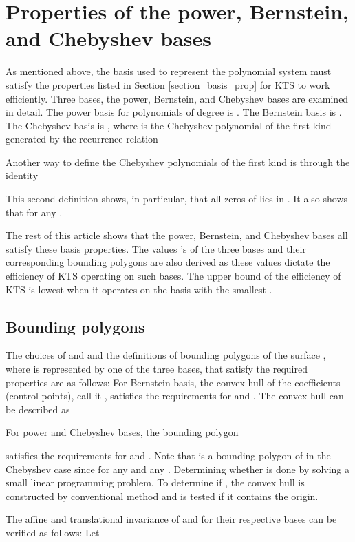 \documentclass[12pt]{article}
\begin{document}
\section{Properties of the power, Bernstein, and Chebyshev bases}

As mentioned above, the basis used to represent the polynomial
system must satisfy the properties listed in Section
\ref{section_basis_prop} for KTS to work efficiently. Three bases,
the power, Bernstein, and Chebyshev bases are examined in detail.
The power basis for polynomials of degree  is 
. The Bernstein basis is  .
The Chebyshev basis is   ,
where  is the Chebyshev polynomial of the first kind
generated by the recurrence relation

Another way to define the Chebyshev polynomials of the first kind
is through the identity

This second definition shows, in particular, that all zeros of 
lies in .  It also shows that  for any .

The rest of this article shows that the power, Bernstein, and Chebyshev
bases all satisfy these basis properties.  The values 's of
the three bases and their corresponding bounding polygons are also
derived as these values dictate the efficiency
of KTS operating on such bases.  The upper bound of the efficiency of KTS
is lowest when it operates on the basis with the smallest .

\subsection{Bounding polygons}

\label{section_bounding_polygon} The choices of 
and  and the definitions of bounding polygons of the surface
, where  is represented
by one of the three bases, that satisfy the required properties
are as follows: For Bernstein
basis, the convex hull of the coefficients (control points), call
it , satisfies the requirements for  and .  The
convex hull  can be described as

For power and Chebyshev bases, the bounding polygon

satisfies the requirements for  and .  Note that
 is a bounding polygon of  in the Chebyshev case since 
for any  and any .
Determining whether  is done by solving a small linear programming problem.
To determine if ,
the convex hull is constructed by conventional method and is tested if
it contains the origin.

The affine and translational invariance of  and 
for their respective bases can be verified as follows:  Let
\end{document}

